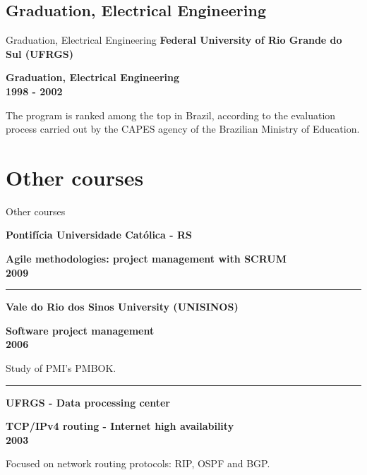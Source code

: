 \documentclass[ignorenonframetext]{beamer}
\newcommand{\myempha}[1]{{\color{dark27c1}\bf #1}}
\newcommand{\myemphb}[1]{{\color{dark27c2}\bf #1}}
\newcommand{\myemphc}[1]{{\color{dark27c3}\bf #1}}
\begin{document}
\subsection{Graduation, Electrical Engineering}
\begin{frame}{Graduation, Electrical Engineering}
    \myempha{Federal University of Rio Grande do Sul (UFRGS)}

    \myemphb{Graduation, Electrical Engineering} \\
    \hfill \myemphc{1998 - 2002}

    The program is ranked among the top in Brazil, according to the
evaluation process carried out by the CAPES agency of the Brazilian
Ministry of Education.

\end{frame}




\section{Other courses}

\begin{frame}{Other courses}




    \myempha{Pontifícia Universidade Católica - RS}

    \myemphb{Agile methodologies: project management with SCRUM} \\
    \hfill \myemphc{2009}

    




    \vspace{1em}
    \hrule{}
    \vspace{1em}


    \myempha{Vale do Rio dos Sinos University (UNISINOS)}

    \myemphb{Software project management} \\
    \hfill \myemphc{2006}

    Study of PMI's PMBOK.





    \vspace{1em}
    \hrule{}
    \vspace{1em}


    \myempha{UFRGS - Data processing center}

    \myemphb{TCP/IPv4 routing - Internet high availability} \\
    \hfill \myemphc{2003}

    Focused on network routing protocols: RIP, OSPF and BGP.



\end{frame}
\end{document}
